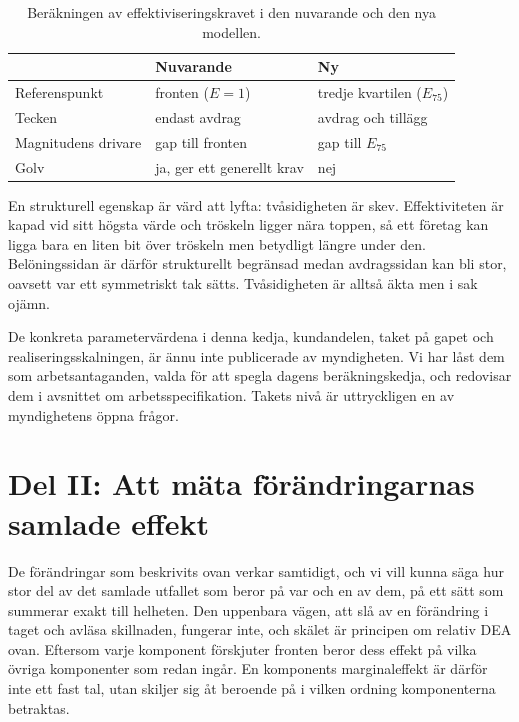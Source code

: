 \documentclass[11pt,a4paper]{article}
\begin{document}
\begin{table}[h]
  \centering
  \caption{Beräkningen av effektiviseringskravet i den nuvarande och den nya modellen.}
  \label{tab:krav}
  \begin{tabular}{lll}
    \toprule
                          & Nuvarande                & Ny \\
    \midrule
    Referenspunkt         & fronten ($E = 1$)        & tredje kvartilen ($E_{75}$) \\
    Tecken                & endast avdrag            & avdrag och tillägg \\
    Magnitudens drivare   & gap till fronten         & gap till $E_{75}$ \\
    Golv                  & ja, ger ett generellt krav & nej \\
    \bottomrule
  \end{tabular}
\end{table}

En strukturell egenskap är värd att lyfta: tvåsidigheten är skev. Effektiviteten är kapad vid sitt
högsta värde och tröskeln ligger nära toppen, så ett företag kan ligga bara en liten bit över
tröskeln men betydligt längre under den. Belöningssidan är därför strukturellt begränsad medan
avdragssidan kan bli stor, oavsett var ett symmetriskt tak sätts. Tvåsidigheten är alltså äkta men
i sak ojämn.

De konkreta parametervärdena i denna kedja, kundandelen, taket på gapet och realiseringsskalningen,
är ännu inte publicerade av myndigheten. Vi har låst dem som arbetsantaganden, valda för att spegla
dagens beräkningskedja, och redovisar dem i avsnittet om arbetsspecifikation. Takets nivå är
uttryckligen en av myndighetens öppna frågor.

\section{Del II: Att mäta förändringarnas samlade effekt}

De förändringar som beskrivits ovan verkar samtidigt, och vi vill kunna säga hur stor del av det
samlade utfallet som beror på var och en av dem, på ett sätt som summerar exakt till helheten. Den
uppenbara vägen, att slå av en förändring i taget och avläsa skillnaden, fungerar inte, och skälet
är principen om relativ DEA ovan. Eftersom varje komponent förskjuter fronten beror dess effekt på
vilka övriga komponenter som redan ingår. En komponents marginaleffekt är därför inte ett fast tal,
utan skiljer sig åt beroende på i vilken ordning komponenterna betraktas.
\end{document}
